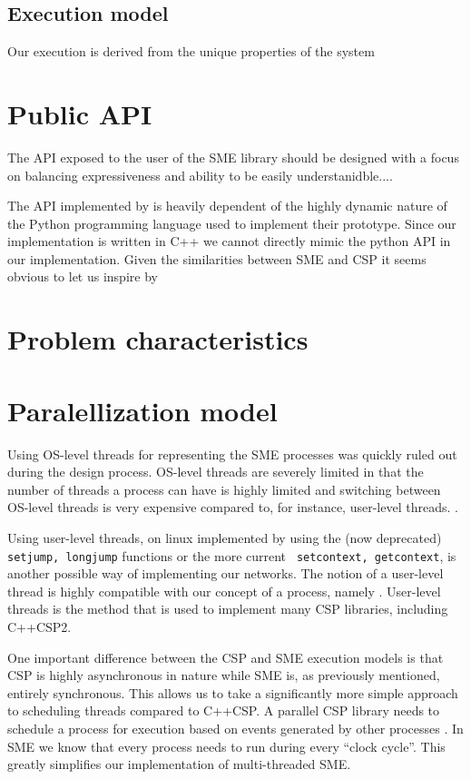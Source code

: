 \subsection{Execution model}
Our execution is derived from the unique properties of the system

\section{Public API}
The API exposed to the user of the SME library should be designed with
a focus on balancing expressiveness and ability to be easily
understanidble....

The API implemented by \cite{vinter2014synchronous} is heavily
dependent of the highly dynamic nature of the Python programming
language used to implement their prototype. Since our implementation
is written in C++ we cannot directly mimic the python API in our
implementation. Given the similarities between SME and CSP it seems
obvious to let us inspire by 

\section{Problem characteristics}

\section{Paralellization model}

Using OS-level threads for representing the SME processes was quickly
ruled out during the design process. OS-level threads are severely
limited in that the number of threads a process can have is highly
limited  and
switching between OS-level threads is very expensive compared to, for
instance, user-level threads. \cite{sung2002comparative}.

Using user-level threads, on linux implemented by using the (now
deprecated)  \texttt{setjump, longjump} functions or the more current \texttt{
setcontext, getcontext}, is another possible way of implementing our
networks. The notion of a user-level thread is highly compatible with
our concept of a process, namely . User-level threads is the
method that is used to implement many CSP libraries, including
C++CSP2.

One important difference between the CSP and SME execution models is
that CSP is highly asynchronous in nature while SME is, as previously
mentioned, entirely synchronous. This allows us to take a
significantly more simple approach to scheduling threads compared to
C++CSP. A parallel CSP library needs to schedule a process for
execution based on events generated by other processes
\cite{brown2003introduction}. In SME we know that every process needs
to run  during every ``clock
cycle''. This greatly simplifies our implementation of multi-threaded
SME.

